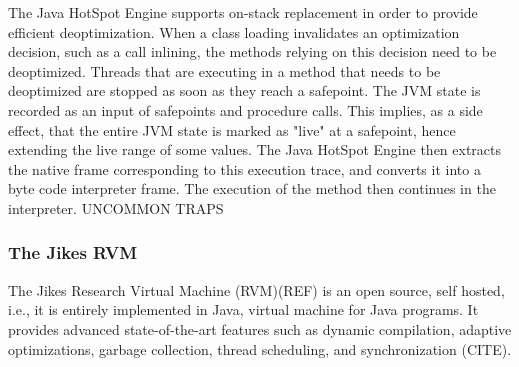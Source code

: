 The Java HotSpot Engine supports on-stack replacement in order to provide efficient deoptimization\cite{paleczny2001java}.
When a class loading invalidates an optimization decision, such as a call inlining, the methods relying on this decision need to be deoptimized.
Threads that are executing in a method that needs to be deoptimized are stopped as soon as they reach a safepoint.
The JVM state is recorded as an input of safepoints and procedure calls.
This implies, as a side effect, that the entire JVM state is marked as "live" at a safepoint, hence extending the live range of some values.
The Java HotSpot Engine then extracts the native frame corresponding to this execution trace, and converts it into a byte code interpreter frame.
The execution of the method then continues in the interpreter.
UNCOMMON TRAPS\\

\subsubsection{The Jikes RVM}
The Jikes Research Virtual Machine (RVM)(REF) is an open source, self hosted, i.e., it is entirely implemented in Java, virtual machine for Java programs.
It provides advanced state-of-the-art features such as dynamic compilation, adaptive optimizations, garbage collection, thread scheduling, and synchronization (CITE).\\

